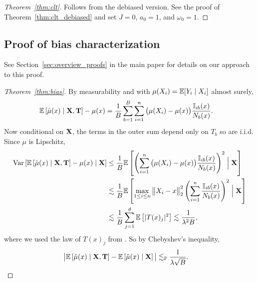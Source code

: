\begin{proof}[Theorem~\ref{thm:clt}]
  Follows from the debiased version.
  See the proof of Theorem~\ref{thm:clt_debiased} and set $J=0$,
  $a_0 = 1$, and $\omega_0 = 1$.
\end{proof}

\subsection*{Proof of bias characterization}

See Section~\ref{sec:overview_proofs} in the main paper
for details on our approach to this proof.

\begin{proof}[Theorem~\ref{thm:bias}]


  By measurability and with $\mu(X_i) = \mathbb{E}[Y_i \mid X_i]$ almost surely,
  \begin{align*}
    \mathbb{E} \left[ \hat \mu(x) \mid \mathbf{X}, \mathbf{T} \right]
    - \mu(x)
    &=
    \frac{1}{B}
    \sum_{b=1}^B
    \sum_{i=1}^n \big( \mu(X_i) - \mu(x) \big)
    \frac{\mathbb{I}_{i b}(x)}{N_b(x)}.
  \end{align*}
  Now conditional on $\mathbf{X}$,
  the terms in the outer sum depend only on $T_b$ so are i.i.d.
  Since $\mu$ is Lipschitz,
  \begin{align*}
    \operatorname{Var} \left[
      \mathbb{E} \left[ \hat \mu(x) \mid \mathbf{X}, \mathbf{T} \right]
      - \mu(x)
      \mid \mathbf{X}
    \right]
    &\leq
    \frac{1}{B}
    \mathbb{E} \left[
      \left(
        \sum_{i=1}^n \big( \mu(X_i) - \mu(x) \big)
        \frac{\mathbb{I}_{i b}(x)}{N_b(x)}
      \right)^2
      \Bigm| \mathbf{X}
    \right] \\
    &\lesssim
    \frac{1}{B}
    \mathbb{E} \left[
      \max_{1 \leq i \leq n}
      \big\| X_i - x \big\|_2^2
      \left(
        \sum_{i=1}^n
        \frac{\mathbb{I}_{i b}(x)}{N_b(x)}
      \right)^2
      \Bigm| \mathbf{X}
    \right] \\
    &\lesssim
    \frac{1}{B}
    \sum_{j=1}^{d}
    \mathbb{E} \left[
      |T(x)_j|^2
    \right]
    \lesssim
    \frac{1}{\lambda^2 B},
  \end{align*}
  where we used the law of $T(x)_j$ from
  \citet[Proposition~1]{mourtada2020minimax}.
  So by Chebyshev's inequality,
  \begin{align*}
    \big|
    \mathbb{E} \left[ \hat \mu(x) \mid \mathbf{X}, \mathbf{T} \right]
    - \mathbb{E} \left[ \hat \mu(x) \mid \mathbf{X} \right]
    \big|
    &\lesssim_{\mathbb{P}}
    \frac{1}{\lambda \sqrt B}.
  \end{align*}


\end{proof}
